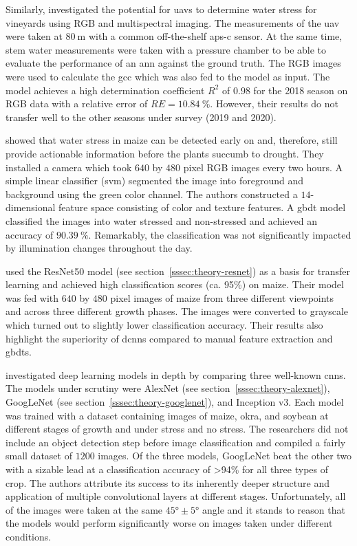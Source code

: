 \documentclass[final]{vutinfth} %
\begin{document}
Similarly, \textcite{lopez-garcia2022} investigated the potential for
\glspl{uav} to determine water stress for vineyards using RGB and
multispectral imaging. The measurements of the \gls{uav} were taken at
$\qty{80}{\meter}$ with a common off-the-shelf \gls{aps-c} sensor. At
the same time, stem water measurements were taken with a pressure
chamber to be able to evaluate the performance of an \gls{ann} against
the ground truth. The RGB images were used to calculate the \gls{gcc}
which was also fed to the model as input. The model achieves a high
determination coefficient $R^{2}$ of $0.98$ for the 2018 season on RGB
data with a relative error of $RE = \qty{10.84}{\percent}$. However,
their results do not transfer well to the other seasons under survey
(2019 and 2020).

\textcite{zhuang2017} showed that water stress in maize can be
detected early on and, therefore, still provide actionable information
before the plants succumb to drought. They installed a camera which
took $640$ by $480$ pixel RGB images every two hours. A simple linear
classifier (\gls{svm}) segmented the image into foreground and
background using the green color channel. The authors constructed a
$14$-dimensional feature space consisting of color and texture
features. A \gls{gbdt} model classified the images into water stressed
and non-stressed and achieved an accuracy of
$\qty{90.39}{\percent}$. Remarkably, the classification was not
significantly impacted by illumination changes throughout the day.

\textcite{an2019} used the ResNet50 model (see
section~\ref{sssec:theory-resnet}) as a basis for transfer learning and
achieved high classification scores (ca. 95\%) on maize. Their model
was fed with $640$ by $480$ pixel images of maize from three different
viewpoints and across three different growth phases. The images were
converted to grayscale which turned out to slightly lower
classification accuracy. Their results also highlight the superiority
of \glspl{dcnn} compared to manual feature extraction and
\glspl{gbdt}.

\textcite{chandel2021} investigated deep learning models in depth by
comparing three well-known \glspl{cnn}. The models under scrutiny were
AlexNet (see section~\ref{sssec:theory-alexnet}), GoogLeNet (see
section~\ref{sssec:theory-googlenet}), and Inception v3. Each model
was trained with a dataset containing images of maize, okra, and
soybean at different stages of growth and under stress and no
stress. The researchers did not include an object detection step
before image classification and compiled a fairly small dataset of
$1200$ images. Of the three models, GoogLeNet beat the other two with
a sizable lead at a classification accuracy of >94\% for all three
types of crop. The authors attribute its success to its inherently
deeper structure and application of multiple convolutional layers at
different stages. Unfortunately, all of the images were taken at the
same $\ang{45}\pm\ang{5}$ angle and it stands to reason that the models
would perform significantly worse on images taken under different
conditions.
\end{document}
